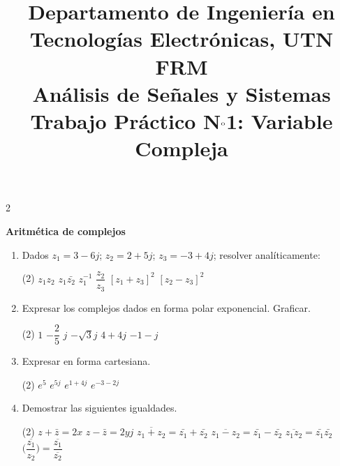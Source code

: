 \documentclass[10pt,a4paper]{article}
\title{%
	{\normalsize Departamento de Ingeniería en Tecnologías Electrónicas, UTN FRM}\\[0.1cm]
	{\large Análisis de Señales y Sistemas}\\[0.15cm]
	{\normalsize Trabajo Práctico N$^{\text o}$1: Variable Compleja}%
}
\author{}
\date{}
\begin{document}
	\maketitle
	\thispagestyle{fancy}
	
	\begin{multicols}{2}
		
		\label{sec:enun}
			\textbf{Aritmética de complejos}
			\begin{enumerate}
			\item {Dados $z_1=3-6j$; $z_2=2+5j$; $z_3=-3+4j$; resolver analíticamente:}
			\begin{tasks}(2)
				\task $z_1z_2$
				\task $z_1\bar{z_2}$
				\task $z_1^{-1}$
				\task $\dfrac{z_2}{z_3}$
				\task $[z_1+z_3]^2$
				\task $[z_2 - z_3]^2$
			\end{tasks}
			
			\item {Expresar los complejos dados en forma polar exponencial. Graficar.}
			\begin{tasks}(2)
				\task $1$
				\task $-\dfrac{2}{5}$
				\task $j$
				\task $-\sqrt{3}j$
				\task $4+4j$
				\task $-1-j$
			\end{tasks}
			
			\item {Expresar en forma cartesiana.}
			\begin{tasks}(2)
				\task $e^5$
				\task $e^{5j}$
				\task $e^{1+4j}$
				\task $e^{-3-2j}$
			\end{tasks}
			
			\item {Demostrar las siguientes igualdades.}
			\begin{tasks}(2)
				\task $z+\bar{z}=2x$
				\task $z-\bar{z}=2yj$
				\task $\overline{z_1 + z_2}=\bar{z_1}+\bar{z_2}$
				\task $\overline{z_1 - z_2}=\bar{z_1}-\bar{z_2}$
				\task $\overline{z_1 z_2}=\bar{z_1}\bar{z_2}$
				\task $\overline{ \big( \dfrac{z_1}{z_2}\big)}=\dfrac{\overline{z_1}}{\overline{z_2}}$
			\end{tasks}
			

\end{enumerate}
\end{multicols}
\end{document}
